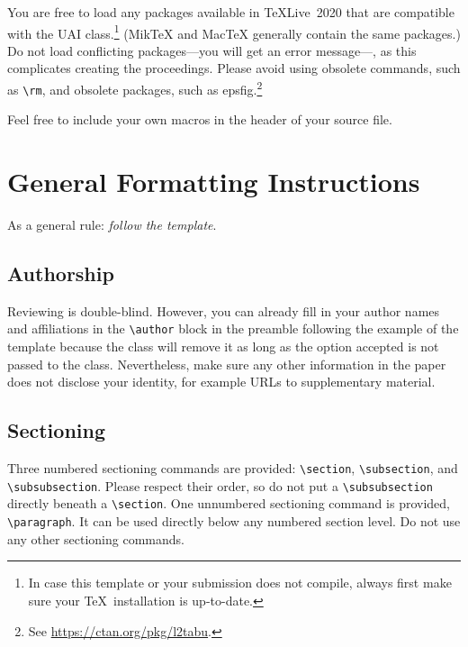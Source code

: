 \documentclass{uai2026} %
\newcommand{\swap}[3][-]{#3#1#2} %
\begin{document}
You are free to load any packages available in \TeX{Live}~2020 that are compatible with the UAI class.\footnote{In case this template or your submission does not compile, always first make sure your \TeX\ installation is up-to-date.}
(Mik\TeX{} and Mac\TeX{} generally contain the same packages.)
Do not load conflicting packages—you will get an error message—, as this complicates creating the proceedings.
Please avoid using obsolete commands, such as \verb|\rm|, and obsolete packages, such as \textsf{epsfig}.\footnote{%
  See \url{https://ctan.org/pkg/l2tabu}.
}

\swap[ ]{in the header of your source file.}{Feel free to include your own macros}

\section{General Formatting Instructions}
As a general rule: \emph{follow the template}.

\subsection{Authorship}
Reviewing is double-blind.
However, you can already fill in your author names and affiliations in the \verb|\author| block in the preamble following the example of the template because the class will remove it as long as the option \textsf{accepted} is not passed to the class.
Nevertheless, make sure any other information in the paper does not disclose your identity, for example URLs to supplementary material.

\subsection{Sectioning}
Three numbered sectioning commands are provided: \verb|\section|, \verb|\subsection|, and \verb|\subsubsection|.
Please respect their order, so do not put a \verb|\subsubsection| directly beneath a \verb|\section|.
One unnumbered sectioning command is provided, \verb|\paragraph|.
It can be used directly below any numbered section level.
Do not use any other sectioning commands.
\end{document}
